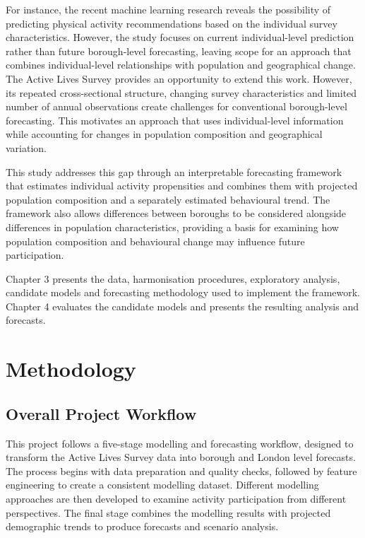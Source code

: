 \documentclass[ %
                    author={Ashrey Ashrey, Sanya Kapoor, Trisha Sharma, Yash Bhooshan Pandloskar},
                supervisor={Dr. Dalila O’Grady},
                    degree={MSc},
                     title={Using machine learning to forecast physical activity participation, volunteering and activity patterns in London},
                  subtitle={},
                      type={},
                      year={2021}]{dissertation}
\begin{document}
For instance, the recent machine learning research \cite{choe_lee_kang_2025} reveals the possibility of predicting physical activity recommendations based on the individual survey characteristics. However, the study focuses on current individual-level prediction rather than future borough-level forecasting, leaving scope for an approach that combines individual-level relationships with population and geographical change. The Active Lives Survey provides an opportunity to extend this work. However, its repeated cross-sectional structure, changing survey characteristics and limited number of annual observations create challenges for conventional borough-level forecasting. This motivates an approach that uses individual-level information while accounting for changes in population composition and geographical variation.

This study addresses this gap through an interpretable forecasting framework that estimates individual activity propensities and combines them with projected population composition and a separately estimated behavioural trend. The framework also allows differences between boroughs to be considered alongside differences in population characteristics, providing a basis for examining how population composition and behavioural change may influence future participation.

Chapter 3 presents the data, harmonisation procedures, exploratory analysis, candidate models and forecasting methodology used to implement the framework. Chapter 4 evaluates the candidate models and presents the resulting analysis and forecasts.



\chapter{Methodology}
\label{chap:methodology}

\FloatBarrier
\section{Overall Project Workflow}

\noindent
This project follows a five-stage modelling and forecasting workflow, designed to transform the Active Lives Survey data into borough and London level forecasts. The process begins with data preparation and quality checks, followed by feature engineering to create a consistent modelling dataset. Different modelling approaches are then developed to examine activity participation from different perspectives. The final stage combines the modelling results with projected demographic trends to produce forecasts and scenario analysis.
\end{document}
